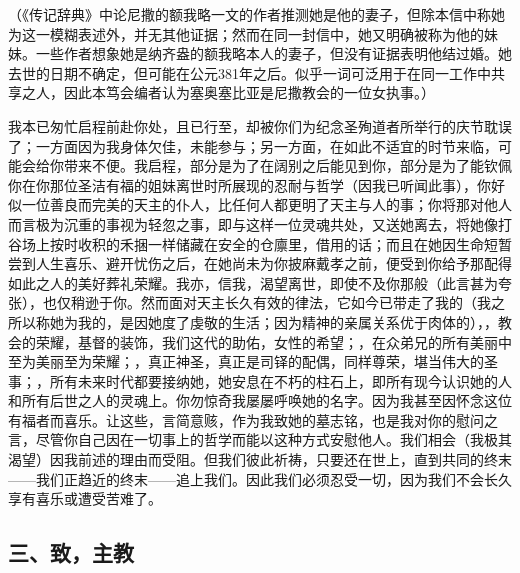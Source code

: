 （《传记辞典》中论尼撒的额我略一文的作者推测她是他的妻子，但除本信中称她为这一模糊表述外，并无其他证据；然而在同一封信中，她又明确被称为他的妹妹。一些作者想象她是纳齐盎的额我略本人的妻子，但没有证据表明他结过婚。她去世的日期不确定，但可能在公元381年之后。似乎一词可泛用于在同一工作中共享之人，因此本笃会编者认为塞奥塞比亚是尼撒教会的一位女执事。）\par

我本已匆忙启程前赴你处，且已行至，却被你们为纪念圣殉道者所举行的庆节耽误了；一方面因为我身体欠佳，未能参与；另一方面，在如此不适宜的时节来临，可能会给你带来不便。我启程，部分是为了在阔别之后能见到你，部分是为了能钦佩你在你那位圣洁有福的姐妹离世时所展现的忍耐与哲学（因我已听闻此事），你好似一位善良而完美的天主的仆人，比任何人都更明了天主与人的事；你将那对他人而言极为沉重的事视为轻忽之事，即与这样一位灵魂共处，又送她离去，将她像打谷场上按时收积的禾捆一样储藏在安全的仓廪里，借用的话；而且在她因生命短暂尝到人生喜乐、避开忧伤之后，在她尚未为你披麻戴孝之前，便受到你给予那配得如此之人的美好葬礼荣耀。我亦，信我，渴望离世，即使不及你那般（此言甚为夸张），也仅稍逊于你。然而面对天主长久有效的律法，它如今已带走了我的（我之所以称她为我的，是因她度了虔敬的生活；因为精神的亲属关系优于肉体的），，教会的荣耀，基督的装饰，我们这代的助佑，女性的希望；，在众弟兄的所有美丽中至为美丽至为荣耀；，真正神圣，真正是司铎的配偶，同样尊荣，堪当伟大的圣事；，所有未来时代都要接纳她，她安息在不朽的柱石上，即所有现今认识她的人和所有后世之人的灵魂上。你勿惊奇我屡屡呼唤她的名字。因为我甚至因怀念这位有福者而喜乐。让这些，言简意赅，作为我致她的墓志铭，也是我对你的慰问之言，尽管你自己因在一切事上的哲学而能以这种方式安慰他人。我们相会（我极其渴望）因我前述的理由而受阻。但我们彼此祈祷，只要还在世上，直到共同的终末——我们正趋近的终末——追上我们。因此我们必须忍受一切，因为我们不会长久享有喜乐或遭受苦难了。\par


\subsection{三、致，主教}


